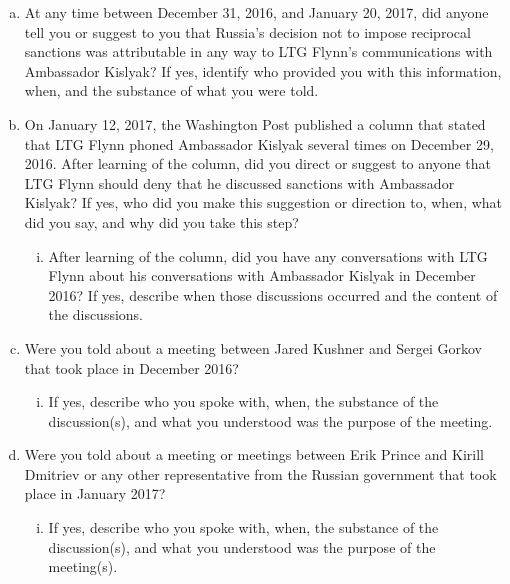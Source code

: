 \begin{enumerate}[a.]
\begin{enumerate}[i.]
\end{enumerate}

\item At any time between December 31, 2016, and January 20, 2017, did anyone tell you or suggest to you that Russia’s decision not to impose reciprocal sanctions was attributable in any way to LTG Flynn’s communications with Ambassador Kislyak?
If yes, identify who provided you with this information, when, and the substance of what you were told.

\item On January 12, 2017, the Washington Post published a column that stated that LTG Flynn phoned Ambassador Kislyak several times on December 29, 2016.
After learning of the column, did you direct or suggest to anyone that LTG Flynn should deny that he discussed sanctions with Ambassador Kislyak?
If yes, who did you make this suggestion or direction to, when, what did you say, and why did you take this step?

\begin{enumerate}[i.]

\item After learning of the column, did you have any conversations with LTG Flynn about his conversations with Ambassador Kislyak in December 2016?
If yes, describe when those discussions occurred and the content of the discussions.

\end{enumerate}

\item Were you told about a meeting between Jared Kushner and Sergei Gorkov that took place in December 2016?

\begin{enumerate}[i.]

\item If yes, describe who you spoke with, when, the substance of the discussion(s), and what you understood was the purpose of the meeting.

\end{enumerate}

\item Were you told about a meeting or meetings between Erik Prince and Kirill Dmitriev or any other representative from the Russian government that took place in January 2017?

\begin{enumerate}[i.]

\item If yes, describe who you spoke with, when, the substance of the discussion(s), and what you understood was the purpose of the meeting(s).


\end{enumerate}
\end{enumerate}
